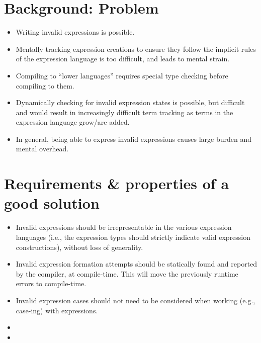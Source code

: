 \section{Background: Problem}

\begin{itemize}
    
    \item Writing invalid expressions is possible.
    
    \item Mentally tracking expression creations to ensure they follow the
          implicit rules of the expression language is too difficult, and leads
          to mental strain.

    \item Compiling to ``lower languages'' requires special type checking before
          compiling to them. 
    
    \item Dynamically checking for invalid expression states is possible, but
          difficult and would result in increasingly difficult term tracking as
          terms in the expression language grow/are added.

    \item In general, being able to express invalid expressions causes large
          burden and mental overhead.
    
\end{itemize}


\section{Requirements \& properties of a good solution}

\begin{itemize}
    
    \item Invalid expressions should be irrepresentable in the various expression
          languages (i.e., the expression types should strictly indicate valid
          expression constructions), without loss of generality.
    
    \item Invalid expression formation attempts should be statically found and
          reported by the compiler, at compile-time. This will move the
          previously runtime errors to compile-time.

    \item Invalid expression cases should not need to be considered when working
          (e.g., case-ing) with expressions.

    \item {}
    
    \item {}

\end{itemize}

